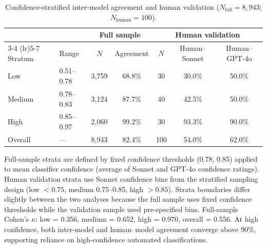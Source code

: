 \begin{table}[H]
\centering
\begin{threeparttable}
\caption{Confidence-stratified inter-model agreement and human validation ($N_\text{full} = 8{,}943$; $N_\text{human} = 100$).}
\label{tab:conf_strat_full}
\begin{small}
\begin{tabular}{llccccc}
\toprule
 & & \multicolumn{2}{c}{Full sample} & \multicolumn{3}{c}{Human validation} \\
\cmidrule(lr){3-4} \cmidrule(lr){5-7}
Stratum & Range & $N$ & Agreement & $N$ & Human--Sonnet & Human--GPT-4o \\
\midrule
Low     & 0.51--0.78 & 3{,}759 & 68.8\% & 30 & 30.0\% & 50.0\% \\
Medium  & 0.78--0.83 & 3{,}124 & 87.7\% & 40 & 42.5\% & 50.0\% \\
High    & 0.85--0.97 & 2{,}060 & 99.2\% & 30 & 93.3\% & 90.0\% \\
\midrule
Overall & ---        & 8{,}943 & 82.4\% & 100 & 54.0\% & 62.0\% \\
\bottomrule
\end{tabular}
\end{small}
\begin{tablenotes}
\small
\item Full-sample strata are defined by fixed confidence thresholds (0.78, 0.85) applied to mean classifier confidence (average of Sonnet and GPT-4o confidence ratings). Human validation strata use Sonnet confidence bins from the stratified sampling design (low $< 0.75$, medium 0.75--0.85, high $> 0.85$). Strata boundaries differ slightly between the two analyses because the full sample uses fixed confidence thresholds while the validation sample used pre-specified bins. Full-sample Cohen's $\kappa$: low = 0.356, medium = 0.652, high = 0.970, overall = 0.556. At high confidence, both inter-model and human--model agreement converge above 90\%, supporting reliance on high-confidence automated classifications.
\end{tablenotes}
\end{threeparttable}
\end{table}
